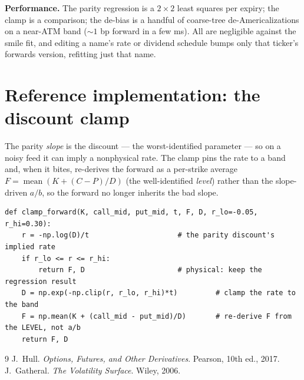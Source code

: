 \documentclass[11pt]{article}
\begin{document}
\noindent\textbf{Performance.} The parity regression is a $2\times2$ least squares
per expiry; the clamp is a comparison; the de-bias is a handful of coarse-tree
de-Americalizations on a near-ATM band ($\sim1$ bp forward in a few ms). All are
negligible against the smile fit, and editing a name's rate or dividend schedule
bumps only that ticker's forwards version, refitting just that name.

\section{Reference implementation: the discount clamp}
\label{app:ref}

The parity \emph{slope} is the discount --- the worst-identified parameter --- so on
a noisy feed it can imply a nonphysical rate. The clamp pins the rate to a band and,
when it bites, re-derives the forward as a per-strike average $F=\operatorname{mean}
(K+(C-P)/D)$ (the well-identified \emph{level}) rather than the slope-driven $a/b$,
so the forward no longer inherits the bad slope.

\begin{lstlisting}[caption={The discount clamp and forward re-derivation ---
simplified from \texttt{data/forwards.py}, where the clamp is inline in
\texttt{implied\_forward} and the level mean is the quality-weighted
\texttt{\_forward\_at\_discount} (spread $\times$ ATM kernel), with the spot
fallback of \cref{sec:clamp}.}]
def clamp_forward(K, call_mid, put_mid, t, F, D, r_lo=-0.05, r_hi=0.30):
    r = -np.log(D)/t                     # the parity discount's implied rate
    if r_lo <= r <= r_hi:
        return F, D                      # physical: keep the regression result
    D = np.exp(-np.clip(r, r_lo, r_hi)*t)         # clamp the rate to the band
    F = np.mean(K + (call_mid - put_mid)/D)       # re-derive F from the LEVEL, not a/b
    return F, D
\end{lstlisting}

\begin{thebibliography}{9}
 J.~Hull. \emph{Options, Futures, and Other Derivatives}.
Pearson, 10th ed., 2017.
 J.~Gatheral. \emph{The Volatility Surface}. Wiley, 2006.
\end{thebibliography}
\end{document}
